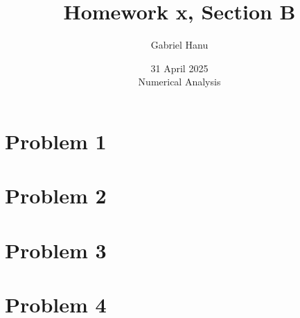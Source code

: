 \documentclass{article}
\title{Homework x, Section B}
\author{Gabriel Hanu}
\date{31 April 2025 \\
Numerical Analysis}
\begin{document}
\maketitle

\section*{Problem 1}

\section*{Problem 2}

\section*{Problem 3}

\section*{Problem 4}
\end{document}
